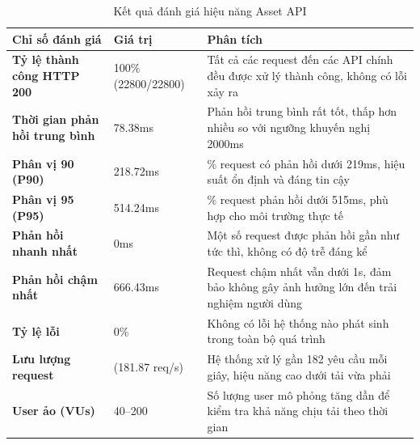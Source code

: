 \begin{table}[H]
\centering
\caption{Kết quả đánh giá hiệu năng Asset API}
\begin{tabular}{|>{\raggedright\arraybackslash}p{4cm}|l|>{\raggedright\arraybackslash}p{7cm}|}
\hline
\textbf{Chỉ số đánh giá} & \textbf{Giá trị} & \textbf{Phân tích} \\
\hline
\textbf{Tỷ lệ thành công HTTP 200} & 100\% (22800/22800) & Tất cả các request đến các API chính đều được xử lý thành công, không có lỗi xảy ra \\
\hline
\textbf{Thời gian phản hồi trung bình} & 78.38ms & Phản hồi trung bình rất tốt, thấp hơn nhiều so với ngưỡng khuyến nghị 2000ms \\
\hline
\textbf{Phân vị 90 (P90)} & 218.72ms & 90\% request có phản hồi dưới 219ms, hiệu suất ổn định và đáng tin cậy \\
\hline
\textbf{Phân vị 95 (P95)} & 514.24ms & 95\% request phản hồi dưới 515ms, phù hợp cho môi trường thực tế \\
\hline
\textbf{Phản hồi nhanh nhất} & 0ms & Một số request được phản hồi gần như tức thì, không có độ trễ đáng kể \\
\hline
\textbf{Phản hồi chậm nhất} & 666.43ms & Request chậm nhất vẫn dưới 1s, đảm bảo không gây ảnh hưởng lớn đến trải nghiệm người dùng \\
\hline
\textbf{Tỷ lệ lỗi} & 0\% & Không có lỗi hệ thống nào phát sinh trong toàn bộ quá trình\\
\hline
\textbf{Lưu lượng request} & (181.87 req/s) & Hệ thống xử lý gần 182 yêu cầu mỗi giây, hiệu năng cao dưới tải vừa phải \\
\hline
\textbf{User ảo (VUs)} & 40--200 & Số lượng user mô phỏng tăng dần để kiểm tra khả năng chịu tải theo thời gian \\
\hline
\end{tabular}
\end{table}

